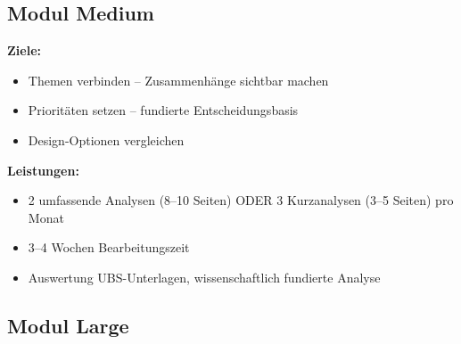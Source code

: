 \documentclass[11pt,a4paper]{article}
\begin{document}
\vspace{0.3cm}
\begin{center}
\end{center}

\newpage
\subsection{Modul Medium}

\textbf{Ziele:}
\begin{itemize}
    \item[$\checkmark$] Themen verbinden -- Zusammenhänge sichtbar machen
    \item[$\checkmark$] Prioritäten setzen -- fundierte Entscheidungsbasis
    \item[$\checkmark$] Design-Optionen vergleichen
\end{itemize}

\textbf{Leistungen:}
\begin{itemize}
    \item 2 umfassende Analysen (8--10 Seiten) ODER 3 Kurzanalysen (3--5 Seiten) pro Monat
    \item 3--4 Wochen Bearbeitungszeit
    \item Auswertung UBS-Unterlagen, wissenschaftlich fundierte Analyse
\end{itemize}

\vspace{0.3cm}
\begin{center}
\end{center}

\vspace{1cm}

\subsection{Modul Large}
\end{document}
